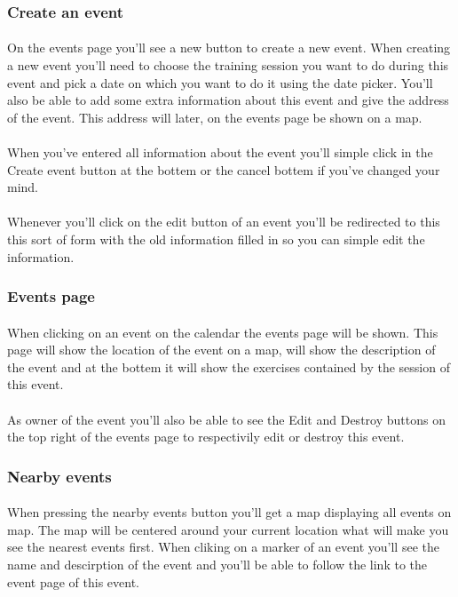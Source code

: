 \documentclass[11pt,a4paper]{scrartcl}
\begin{document}
\subsubsection{Create an event}
\paragraph{}On the events page you'll see a new button to create a new event. When creating a new event you'll need to choose the training session you want to do during this event and pick a date on which you want to do it using the date picker. You'll also be able to add some extra information about this event and give the address of the event. This address will later, on the events page be shown on a map.
\paragraph{}When you've entered all information about the event you'll simple click in the Create event button at the bottem or the cancel bottem if you've changed your mind.
\paragraph{}Whenever you'll click on the edit button of an event you'll be redirected to this this sort of form with the old information filled in so you can simple edit the information.
\subsubsection{Events page}
\paragraph{}When clicking on an event on the calendar the events page will be shown. This page will show the location of the event on a map, will show the description of the event and at the bottem it will show the exercises contained by the session of this event.
\paragraph{}As owner of the event you'll also be able to see the Edit and Destroy buttons on the top right of the events page to respectivily edit or destroy this event.
\subsubsection{Nearby events}
\paragraph{}When pressing the nearby events button you'll get a map displaying all events on map. The map will be centered around your current location what will make you see the nearest events first. When cliking on a marker of an event you'll see the name and descirption of the event and you'll be able to follow the link to the event page of this event.
\end{document}

